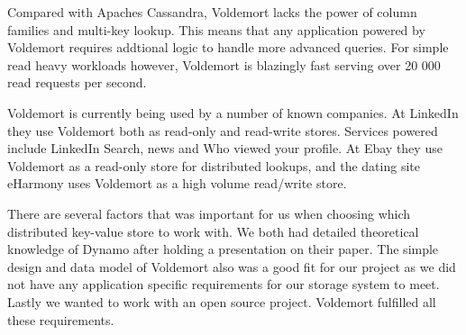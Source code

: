 Compared with Apaches Cassandra, Voldemort lacks the power of column families and multi-key lookup. This means that any application powered by Voldemort requires addtional logic to handle more advanced queries. For simple read heavy workloads however, Voldemort is blazingly fast serving over 20 000 read requests per second. 

Voldemort is currently being used by a number of known companies. At LinkedIn they use Voldemort both as read-only and read-write stores. Services powered include LinkedIn Search, news and Who viewed your profile. At Ebay they use Voldemort as a read-only store for distributed lookups, and the dating site eHarmony uses Voldemort as a high volume read/write store.

There are several factors that was important for us when choosing which distributed key-value store to work with. We both had detailed theoretical knowledge of Dynamo after holding a presentation on their paper. The simple design and data model of Voldemort also was a good fit for our project as we did not have any application specific requirements for our storage system to meet. Lastly we wanted to work with an open source project. Voldemort fulfilled all these requirements. 









